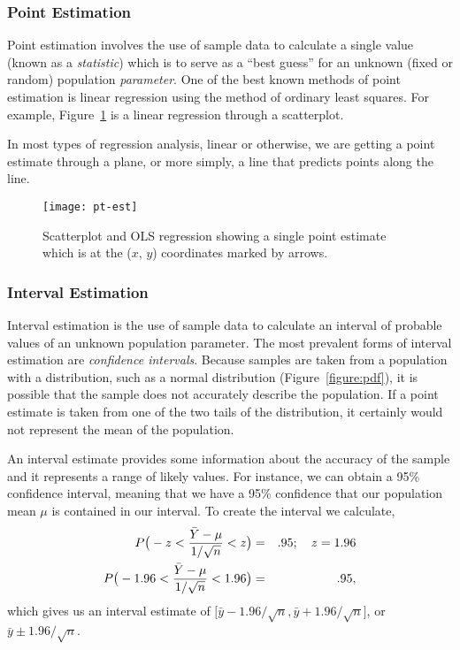 \subsubsection{Point Estimation}
Point estimation involves the use of sample data to calculate a single value (known as a \emph{statistic}) which is to serve as a ``best guess'' for an unknown (fixed or random) population \emph{parameter}.
One of the best known methods of point estimation is linear regression using the method of ordinary least squares. For example, Figure~\ref{figure:pt-est} is a linear regression through a scatterplot.

In most types of regression analysis, linear or otherwise, we are getting a point estimate through a plane, or more simply, a line that predicts points along the line.
\begin{figure}[t]
  \centering
  \texttt{[image: pt-est]}
  \caption[Scatterplot and OLS Regression]{Scatterplot and OLS regression showing a single point estimate which is at the ($x$, $y$) coordinates marked by arrows.}
  \label{figure:pt-est}
\end{figure}

\subsubsection{Interval Estimation}
Interval estimation is the use of sample data to calculate an interval of probable values of an unknown population parameter. The most prevalent forms of interval estimation are \emph{confidence intervals}. Because samples are taken from a population with a distribution, such as a normal distribution (Figure~\ref{figure:pdf}), it is possible that the sample does not accurately describe the population. If a point estimate is taken from one of the two tails of the distribution, it certainly would not represent the mean of the population.

An interval estimate provides some information about the accuracy of the sample and it represents a range of likely values. For instance, we can obtain a 95\% confidence interval, meaning that we have a 95\% confidence that our population mean $\mu$ is contained in our interval. To create the interval we calculate,
\begin{eqnarray}
P \big(-z< \frac{\bar{Y}-\mu}{1/\sqrt{n}}<z \big)&=&.95 ; \quad z= 1.96 \label{eq:conf-int} \\
P \big(-1.96< \frac{\bar{Y}-\mu}{1/\sqrt{n}}<1.96 \big)&=&.95, \notag
\end{eqnarray}
which gives us an interval estimate of $\Big[\bar{y}-1.96/\sqrt{n},\bar{y}+1.96/\sqrt{n} \Big]$, or $\bar{y} \pm 1.96/\sqrt{n}$.

